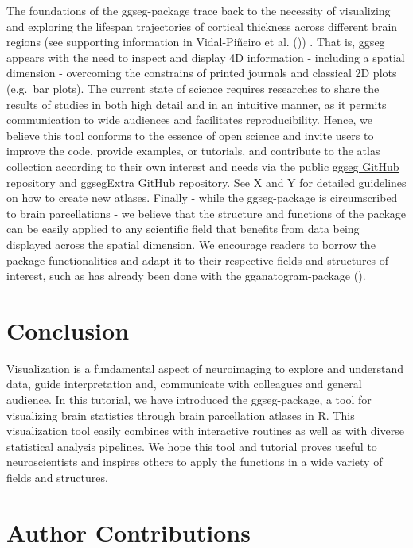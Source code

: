 \documentclass[fleqn,10pt]{wlpeerj} %
\begin{document}
The foundations of the ggseg-package trace back to the necessity of visualizing and exploring the lifespan trajectories of cortical thickness across different brain regions (see supporting information in Vidal-Piñeiro et al. (\citeyearpar{vidal_2019})) .
That is, ggseg appears with the need to inspect and display 4D information - including a spatial dimension - overcoming the constrains of printed journals and classical 2D plots (e.g.~bar plots).
The current state of science requires researches to share the results of studies in both high detail and in an intuitive manner, as it permits communication to wide audiences and facilitates reproducibility.
Hence, we believe this tool conforms to the essence of open science and invite users to improve the code, provide examples, or tutorials, and contribute to the atlas collection according to their own interest and needs via the public \href{https://github.com/LCBC-UiO/ggseg}{ggseg GitHub repository} and \href{https://github.com/LCBC-UiO/ggsegExtra}{ggsegExtra GitHub repository}.
See X and Y for detailed guidelines on how to create new atlases.
Finally - while the ggseg-package is circumscribed to brain parcellations - we believe that the structure and functions of the package can be easily applied to any scientific field that benefits from data being displayed across the spatial dimension.
We encourage readers to borrow the package functionalities and adapt it to their respective fields and structures of interest, such as has already been done with the gganatogram-package (\citet{gganatogram}).

\hypertarget{conclusion}{%
\section{Conclusion}\label{conclusion}}

Visualization is a fundamental aspect of neuroimaging to explore and understand data, guide interpretation and, communicate with colleagues and general audience.
In this tutorial, we have introduced the ggseg-package, a tool for visualizing brain statistics through brain parcellation atlases in R.
This visualization tool easily combines with interactive routines as well as with diverse statistical analysis pipelines. We hope this tool and tutorial proves useful to neuroscientists and inspires others to apply the functions in a wide variety of fields and structures.

\hypertarget{author-contributions}{%
\section{Author Contributions}\label{author-contributions}}
\end{document}

